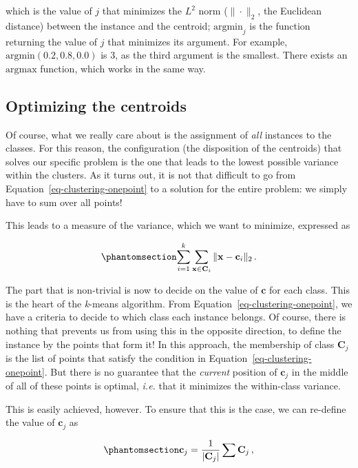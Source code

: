 \documentclass[
  letterpaper,
]{scrbook}
\begin{document}
which is the value of \(j\) that minimizes the \(L^2\) norm
(\(\|\cdot\|_2\), the Euclidean distance) between the instance and the
centroid; \(\text{argmin}_j\) is the function returning the value of
\(j\) that minimizes its argument. For example,
\(\text{argmin}(0.2,0.8,0.0)\) is \(3\), as the third argument is the
smallest. There exists an \(\text{argmax}\) function, which works in the
same way.

\subsection{Optimizing the centroids}\label{optimizing-the-centroids}

Of course, what we really care about is the assignment of \emph{all}
instances to the classes. For this reason, the configuration (the
disposition of the centroids) that solves our specific problem is the
one that leads to the lowest possible variance within the clusters. As
it turns out, it is not that difficult to go from
Equation~\ref{eq-clustering-onepoint} to a solution for the entire
problem: we simply have to sum over all points!

This leads to a measure of the variance, which we want to minimize,
expressed as

\begin{equation}\phantomsection\label{eq-clustering-variance}{
\sum_{i=1}^k \sum_{\mathbf{x}\in \mathbf{C}_i} \|\mathbf{x} - \mathbf{c}_i\|_2 \,.
}\end{equation}

The part that is non-trivial is now to decide on the value of
\(\mathbf{c}\) for each class. This is the heart of the \emph{k}-means
algorithm. From Equation~\ref{eq-clustering-onepoint}, we have a
criteria to decide to which class each instance belongs. Of course,
there is nothing that prevents us from using this in the opposite
direction, to define the instance by the points that form it! In this
approach, the membership of class \(\mathbf{C}_j\) is the list of points
that satisfy the condition in Equation~\ref{eq-clustering-onepoint}. But
there is no guarantee that the \emph{current} position of
\(\mathbf{c}_j\) in the middle of all of these points is optimal,
\emph{i.e.} that it minimizes the within-class variance.

This is easily achieved, however. To ensure that this is the case, we
can re-define the value of \(\mathbf{c}_j\) as

\begin{equation}\phantomsection\label{eq-clustering-centroid-update}{
\mathbf{c}_j = \frac{1}{|\mathbf{C}_j|}\sum\mathbf{C}_j \,,
}\end{equation}
\end{document}
